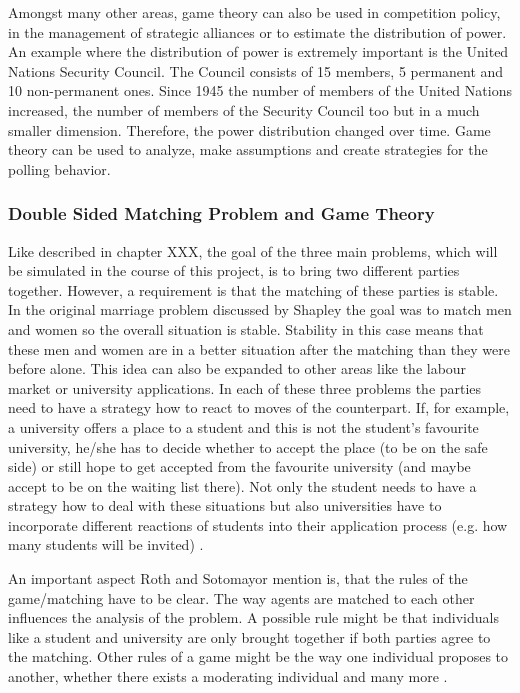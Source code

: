 Amongst many other areas, game theory can also be used in competition policy, in the management of strategic alliances or to estimate the distribution of power. 
An example where the distribution of power is extremely important is the United Nations Security Council. 
The Council consists of 15 members, 5 permanent and 10 non-permanent ones. 
Since 1945 the number of members of the United Nations increased, the number of members of the Security Council too but in a much smaller dimension. 
Therefore, the power distribution changed over time.
Game theory can be used to analyze, make assumptions and create strategies for the polling behavior. \cite{schankanwendungen}



\subsubsection{Double Sided Matching Problem and Game Theory}

Like described in chapter XXX, the goal of the three main problems, which will be simulated in the course of this project, is to bring two different parties together.
However, a requirement is that the matching of these parties is stable.
In the original marriage problem discussed by Shapley the goal was to match men and women so the overall situation is stable.
Stability in this case means that these men and women are in a better situation after the matching than they were before alone. 
This idea can also be expanded to other areas like the labour market or university applications.
In each of these three problems the parties need to have a strategy how to react to moves of the counterpart.
If, for example, a university offers a place to a student and this is not the student's favourite university, he/she has to decide whether to accept the place (to be on the safe side) or still hope to get accepted from the favourite university (and maybe accept to be on the waiting list there).
Not only the student needs to have a strategy how to deal with these situations but also universities have to incorporate different reactions of students into their application process (e.g. how many students will be invited) \cite{gale62a}.

An important aspect Roth and Sotomayor mention is, that the rules of the game/matching have to be clear.
The way agents are matched to each other influences the analysis of the problem.
A possible rule might be that individuals like a student and university are only brought together if both parties agree to the matching.
Other rules of a game might be the way one individual proposes to another, whether there exists a moderating individual and many more \cite[p. 492]{roth1992two}.